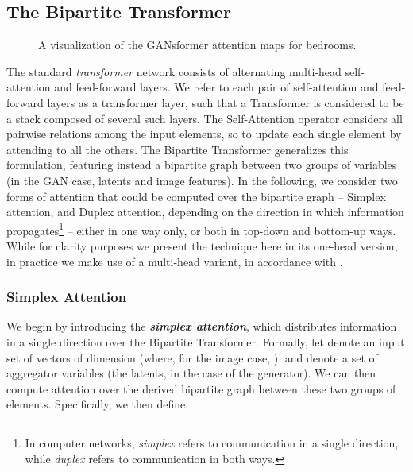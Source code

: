 \documentclass{article}
\begin{document}
\subsection{The Bipartite Transformer}
\label{definition}

\begin{figure*}[ht]
\centering
{}
\hfill
{}
\hfill
{}
\hfill
{}
\hfill
{}
\hfill
{}
\hfill
{}
\vspace*{-5pt}
\caption{\footnotesize A visualization of the GANsformer attention maps for bedrooms.}
\label{attmaps}
\vspace*{-12pt}
\end{figure*}

The standard \textit{transformer} network consists of alternating multi-head self-attention and feed-forward layers. We refer to each pair of self-attention and feed-forward layers as a transformer layer, such that a Transformer is considered to be a stack composed of several such layers. The Self-Attention operator considers all pairwise relations among the input elements, so to update each single element by attending to all the others. The Bipartite Transformer generalizes this formulation, featuring instead a bipartite graph between two groups of variables (in the GAN case, latents and image features). In the following, we consider two forms of attention that could be computed over the bipartite graph -- Simplex attention, and Duplex attention, depending on the direction in which information propagates\footnote{In computer networks, \textit{simplex} refers to communication in a single direction, while \textit{duplex} refers to communication in both ways.} -- either in one way only, or both in top-down and bottom-up ways. While for clarity purposes we present the technique here in its one-head version, in practice we make use of a multi-head variant, in accordance with \citep{transformer}. 

\subsubsection{Simplex Attention}
We begin by introducing the \textbf{\textit{simplex attention}}, which distributes information in a single direction over the Bipartite Transformer. Formally, let  denote an input set of  vectors of dimension  (where, for the image case, ), and  denote a set of  aggregator variables (the latents, in the case of the generator). We can then compute attention over the derived bipartite graph between these two groups of elements. Specifically, we then define:
\end{document}
